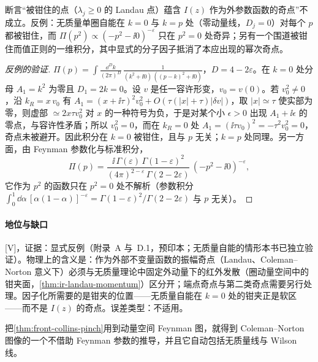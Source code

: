 \begin{proposition}\label{prop:front-landau-not-singular}
断言“被钳住的点（$\lambda_j\ge0$ 的 Landau 点）蕴含 $I(z)$ 作为外参数函数的奇点”不成立。反例：无质量单圈自能在 $k=0$ 与 $k=p$ 处（零动量线，$D_j=0$）对每个 $p$ 都被钳住，而 $\Pi(p^2)\propto(-p^2-\ii0)^{-\varepsilon}$ 只在 $p^2=0$ 处奇异\cite[附录~D.1]{Collins:2020euz}；另有一个围道被钳住而值正则的一维积分，其中显式的分子因子抵消了本应出现的幂次奇点\cite[附录~A]{Collins:2020euz}。
\end{proposition}

\begin{proof}[反例的验证]
$\Pi(p)=\int\frac{\dd^Dk}{(2\pi)^D}\,\frac{1}{(k^2+\ii0)\,((p-k)^2+\ii0)}$，$D=4-2\varepsilon$。在 $k=0$ 处分母 $A_1=k^2$ 为零且 $D_1=2k=0$。设 $v$ 是任一容许形变，$v_0=v(0)$。若 $v_0^2\ne0$，沿 $k_R=x\,v_0$ 有 $A_1=(x+\ii\tau)^2v_0^2+O(\tau(|x|+\tau)|\delta v|)$，取 $|x|\simeq\tau$ 使实部为零，则虚部 $\simeq2x\tau v_0^2$ 对 $x$ 的一种符号为负，于是对某个小 $\epsilon>0$ 出现 $A_1+\ii\epsilon$ 的零点，与容许性矛盾；所以 $v_0^2=0$，而在 $k_R=0$ 处 $A_1=(\ii\tau v_0)^2=-\tau^2v_0^2=0$，奇点未被避开。因此积分在 $k=0$ 被钳住，且与 $p$ 无关；$k=p$ 处同理。另一方面，由 Feynman 参数化与标准积分，
\begin{equation*}
\Pi(p)=\frac{\ii\,\Gamma(\varepsilon)\,\Gamma(1-\varepsilon)^2}{(4\pi)^{2-\varepsilon}\,\Gamma(2-2\varepsilon)}\,(-p^2-\ii0)^{-\varepsilon},
\end{equation*}
它作为 $p^2$ 的函数只在 $p^2=0$ 处不解析（参数积分 $\int_0^1\dd\alpha\,[\alpha(1-\alpha)]^{-\varepsilon}=\Gamma(1-\varepsilon)^2/\Gamma(2-2\varepsilon)$ 与 $p$ 无关）。
\end{proof}

\paragraph{地位与缺口}[V]，证据：显式反例（\cite{Collins:2020euz}附录~A 与~D.1，预印本；无质量自能的情形本书已独立验证）。物理上的含义是：作为外部不变量函数的振幅奇点（Landau、Coleman--Norton 意义下）必须与无质量理论中固定外动量下的红外发散（圈动量空间中的钳夹面，\cref{thm:ir-landau-momentum}）区分开；端点奇点与第二类奇点需要另行处理。因子化所需要的是钳夹的位置——无质量自能在 $k=0$ 处的钳夹正是软区——而不是 $I(z)$ 的奇点。误差类型：不适用。

把\cref{thm:front-collins-pinch}用到动量空间 Feynman 图，就得到 Coleman--Norton 图像的一个不借助 Feynman 参数的推导，并且它自动包括无质量线与 Wilson 线。

